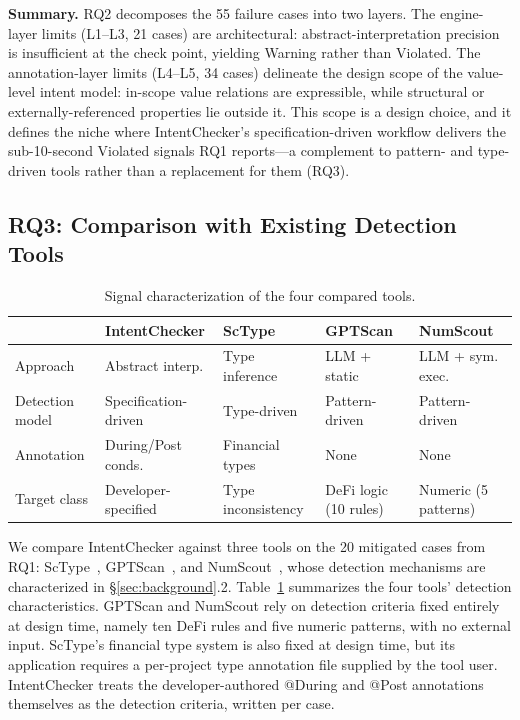 \documentclass[pdflatex,sn-basic]{sn-jnl}%
\theoremstyle{thmstyleone}%
\theoremstyle{thmstyletwo}%
\theoremstyle{thmstylethree}%
\begin{document}
\smallskip
\noindent\textbf{Summary.}
RQ2 decomposes the 55 failure cases into two layers. The engine-layer limits (L1--L3, 21 cases) are architectural: abstract-interpretation precision is insufficient at the check point, yielding Warning rather than Violated. The annotation-layer limits (L4--L5, 34 cases) delineate the design scope of the value-level intent model: in-scope value relations are expressible, while structural or externally-referenced properties lie outside it. This scope is a design choice, and it defines the niche where IntentChecker's specification-driven workflow delivers the sub-10-second Violated signals RQ1 reports---a complement to pattern- and type-driven tools rather than a replacement for them (RQ3).

\subsection{RQ3: Comparison with Existing Detection Tools}\label{sec:rq3}

\begin{table}[t]
\centering
\caption{Signal characterization of the four compared tools.}
\label{tab:rq3-signal}
\small
\begin{tabular}{@{}lllll@{}}
\toprule
 & IntentChecker & ScType & GPTScan & NumScout \\
\midrule
Approach & Abstract interp. & Type inference & LLM + static & LLM + sym. exec. \\
Detection model & Specification-driven & Type-driven & Pattern-driven & Pattern-driven \\
Annotation & During/Post conds. & Financial types & None & None \\
Target class & Developer-specified & Type inconsistency & DeFi logic (10 rules) & Numeric (5 patterns) \\
\bottomrule
\end{tabular}
\end{table}

We compare IntentChecker against three tools on the 20 mitigated cases from RQ1: ScType~\citep{sctype}, GPTScan~\citep{gptscan}, and NumScout~\citep{numscout}, whose detection mechanisms are characterized in \S\ref{sec:background}.2.
Table~\ref{tab:rq3-signal} summarizes the four tools' detection characteristics. GPTScan and NumScout rely on detection criteria fixed entirely at design time, namely ten DeFi rules and five numeric patterns, with no external input. ScType's financial type system is also fixed at design time, but its application requires a per-project type annotation file supplied by the tool user. IntentChecker treats the developer-authored @During and @Post annotations themselves as the detection criteria, written per case.
\end{document}
